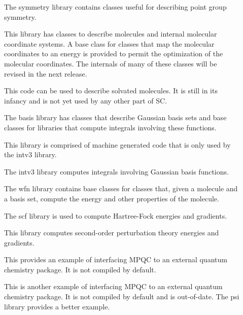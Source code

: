 \documentclass{report}
\begin{document}
\begin{description}
\item[] The symmetry library contains classes
  useful for describing point group symmetry.

\item[] This library has classes to
  describe molecules and internal molecular coordinate systems. A base
  class for classes that map the molecular coordinates to an energy is
  provided to permit the optimization of the molecular coordinates.
  The internals of many of these classes will be revised in the
  next release.

\item[]  This code can be used to
  describe solvated molecules.  It is still in its infancy and
  is not yet used by any other part of SC.

\item[] The basis library has classes
  that describe Gaussian basis sets and base classes for libraries that
  compute integrals involving these functions.

\item[] This library is comprised of
  machine generated code that is only used by the intv3 library.

\item[] The intv3 library computes
  integrals involving Gaussian basis functions.

\item[] The wfn library contains base
  classes for classes that, given a molecule and a basis set, compute the
  energy and other properties of the molecule.

\item[] The scf library is used to compute
  Hartree-Fock energies and gradients.

\item[] This library computes second-order
  perturbation theory energies and gradients.

\item[] This provides an example of
  interfacing MPQC to an external quantum chemistry package.  It
  is not compiled by default.

\item[] This is another example of
  interfacing MPQC to an external quantum chemistry package.  It
  is not compiled by default and is out-of-date.  The psi library
  provides a better example.


\end{description}
\end{document}
